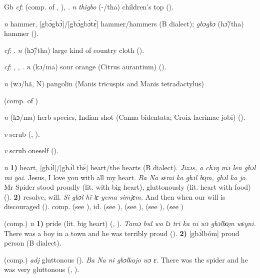 \begin{letter}{Gb}
 \textit{cf}:  (comp. of , ), . \textit{n} \textit{thigbo} (-/tha) children's top (\citealt{Pichl1967}). 

 \textit{n} hammer, [gbɔ̀gbɔ̀]/[gbɔ̀gbɔ̀tɛ́] hammer/hammers (B dialect); \textit{gbɔgbɔ} (hɔ̃/tha) hammer (\citealt{Pichl1967}). 

 \textit{cf}: . \textit{n} (hɔ̃/tha) large kind of country cloth (\citealt{Pichl1967}).

 \textit{cf}: , , . \textit{n} (kɔ/ma) sour orange (Citrus aurantium) (\citealt{Pichl1967}). 

 \textit{n} (wɔ/hã, N) pangolin (Manis tricuspis and Manis tetradactylus)

 (comp. of ) 

 \textit{n} (kɔ/ma) herb species, Indian shot (Canna bidentata; Croix lacrimae jobi) (\citealt{Pichl1967}).

 \textit{v} scrub (\citealt{Pichl1967}, \citealt{Sumner1921}). 

 \textit{v} scrub oneself (\citealt{Pichl1967}). 

 \textit{n} \textbf{1)} heart, [gbɔ̀l]/[gbɔ̀l thɛ́] heart/the hearts (B dialect). \textit{Jizɔs, a chɔŋ mɔ len gbɔl mi yai.} Jesus, I love you with all my heart. \textit{Ba Na sɛmi ka gbɔl bo̹m, gbɔl ka jo.} Mr Spider stood proudly (lit. with big heart), gluttonously (lit. heart with food) (\citealt{Pichl1967}). \textbf{2)} resolve, will. \textit{Si gbɔl hĩ lɛ yema simjɛm.} And then when our will is discouraged (\citealt{Pichl1967}). comp.  (see ), id.  (see ),  (see ),  (see ),  (see ) 

 (comp.) \textit{n} \textbf{1)} pride (lit. big heart) (\citealt{Pichl1967}, \citealt{Sumner1921}). \textit{Tamɔ bul wo lɔ trï ka ni wɔ gbɔlbo̹m wɛyni.} There was a boy in a town and he was terribly proud (\citealt{Pichl1967}). \textbf{2)} [gbɔ̀lbóm] proud person (B dialect). 

 (comp.) \textit{adj} gluttonous (\citealt{Pichl1967}). \textit{Ba Na ni gbɔlkajo wɔ ɛ.} There was the spider and he was very gluttonous (\citealt{Pichl1967}, \citealt{Sumner1921}).


\end{letter}
